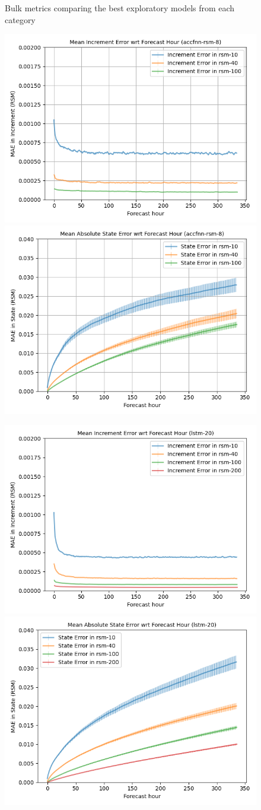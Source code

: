\begin{figure}[hp!]
    \caption{Bulk metrics comparing the best exploratory models from each category}
    \label{best-metrics}
\end{figure}

\begin{figure}[hp!]
    \centering

    \includegraphics[width=.42\linewidth,draft=false]{figures/horizons/eval_test_accfnn-rsm-8_rsm_horizon_na_res.png}
    \includegraphics[width=.42\linewidth,draft=false]{figures/horizons/eval_test_accfnn-rsm-8_rsm_horizon_na_state.png}

    \includegraphics[width=.42\linewidth,draft=false]{figures/horizons/eval_test_lstm-20_rsm_horizon_na_res.png}
    \includegraphics[width=.42\linewidth,draft=false]{figures/horizons/eval_test_lstm-20_rsm_horizon_na_state.png}


\end{figure}
